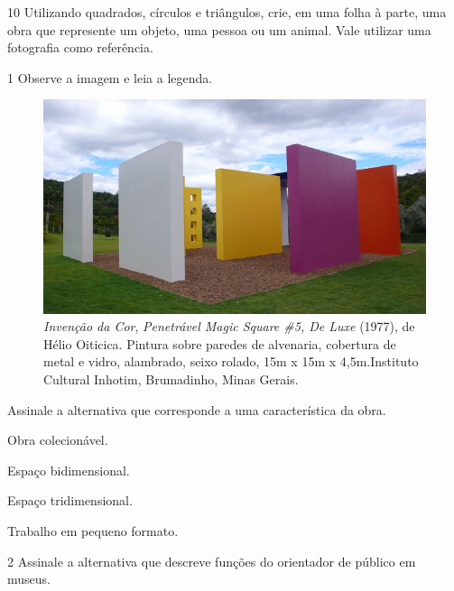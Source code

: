 \pagebreak
\num{10} Utilizando quadrados, círculos e triângulos, crie, em uma folha à parte,
uma obra que represente um objeto, uma pessoa ou um animal. Vale utilizar uma fotografia como referência.



\num{1} Observe a imagem e leia a legenda.

\begin{figure}[htpb!]
\includegraphics[width=\textwidth]{./imgs/art9.png}
\caption{\emph{Invenção da Cor}, \emph{Penetrável Magic Square \#5, De Luxe} (1977), de Hélio Oiticica. Pintura sobre paredes de alvenaria, cobertura de metal e vidro, alambrado, seixo rolado, 15m x 15m x 4,5m.Instituto Cultural Inhotim, Brumadinho, Minas Gerais.}
\end{figure}

Assinale a alternativa que corresponde a uma característica da obra.

\begin{minipage}{.5\textwidth}
\begin{escolha}
\item
  Obra colecionável.
\item
  Espaço bidimensional.
\item
  Espaço tridimensional.
\item
  Trabalho em pequeno formato.
\end{escolha}
\end{minipage}

\pagebreak
\num{2} Assinale a alternativa que descreve funções do orientador de público em museus.

